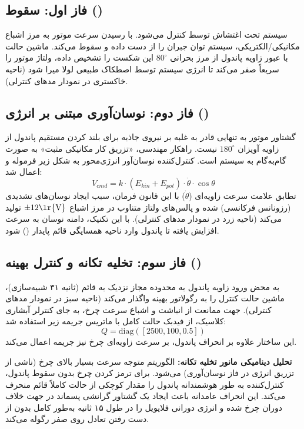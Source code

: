 \documentclass[12pt]{report}
\begin{document}
\subsection{فاز اول: سقوط ()}
سیستم تحت اغتشاش توسط  کنترل می‌شود. با رسیدن سرعت موتور به مرز اشباع مکانیکی/الکتریکی، سیستم توان جبران را از دست داده و سقوط می‌کند. ماشین حالت با عبور زاویه پاندول از مرز بحرانی $80^\circ$ این شکست را تشخیص داده، ولتاژ موتور را سریعاً صفر می‌کند تا انرژی سیستم توسط اصطکاک طبیعی لولا میرا شود (ناحیه خاکستری در نمودار مدهای کنترلی).

\subsection{فاز دوم: نوسان‌آوری مبتنی بر انرژی ()}
گشتاور موتور به تنهایی قادر به غلبه بر نیروی جاذبه برای بلند کردن مستقیم پاندول از زاویه آویزان $180^\circ$ نیست. راهکار مهندسی، «تزریق کار مکانیکی مثبت» به صورت گام‌به‌گام به سیستم است. کنترل‌کننده نوسان‌آور انرژی‌محور به شکل زیر فرموله و اعمال شد:
\[ V_{cmd} = k \cdot (E_{kin} + E_{pot}) \cdot \dot{\theta} \cdot \cos\theta \]
تطابق علامت سرعت زاویه‌ای ($\dot{\theta}$) با این قانون فرمان، سبب ایجاد نوسان‌های تشدیدی (رزونانس فرکانسی) شده و پالس‌های ولتاژ متناوب در مرز اشباع $\pm 12 \text{\lr{V}}$ تولید می‌کند (ناحیه زرد در نمودار مدهای کنترلی). با این تکنیک، دامنه نوسان به سرعت افزایش یافته تا پاندول وارد ناحیه همسایگی قائم پایدار () شود.

\subsection{فاز سوم: تخلیه تکانه و کنترل بهینه ()}
به محض ورود زاویه پاندول به محدوده مجاز نزدیک به قائم (ثانیه ۳۱ شبیه‌سازی)، ماشین حالت کنترل را به رگولاتور بهینه  واگذار می‌کند (ناحیه سبز در نمودار مدهای کنترلی). جهت ممانعت از انباشت و اشباع سرعت چرخ، به جای کنترلر آبشاری کلاسیک، از فیدبک حالت کامل با ماتریس جریمه زیر استفاده شد:
\[ Q = \text{diag}([2500, 100, 0.5]) \]
این ساختار علاوه بر انحراف پاندول، بر سرعت زاویه‌ای چرخ نیز جریمه اعمال می‌کند.

\textbf{تحلیل دینامیکی مانور تخلیه تکانه:}
الگوریتم  متوجه سرعت بسیار بالای چرخ (ناشی از تزریق انرژی در فاز نوسان‌آوری) می‌شود. برای ترمز کردن چرخ بدون سقوط پاندول، کنترل‌کننده به طور هوشمندانه پاندول را مقدار کوچکی از حالت کاملاً قائم منحرف می‌کند. این انحراف عامدانه باعث ایجاد یک گشتاور گرانشی پسماند در جهت خلاف دوران چرخ شده و انرژی دورانی فلایویل را در طول ۱۵ ثانیه به‌طور کامل بدون از دست رفتن تعادل روی صفر رگوله می‌کند.
\end{document}
